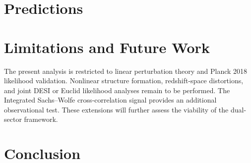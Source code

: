 \documentclass[12pt,a4paper]{article}
\begin{document}
\section{Predictions}

\begin{table}[h]
\centering
\small
\caption{Predictions of the IAM $M$--$\sigma$ derivation.}
\label{tab:predictions}
\end{table}


\section{Limitations and Future Work}

The present analysis is restricted to linear perturbation theory and
Planck 2018 likelihood validation. Nonlinear structure formation,
redshift-space distortions, and joint DESI or Euclid likelihood analyses
remain to be performed. The Integrated Sachs--Wolfe cross-correlation
signal provides an additional observational test. These extensions
will further assess the viability of the dual-sector framework.

\section{Conclusion}
\end{document}
